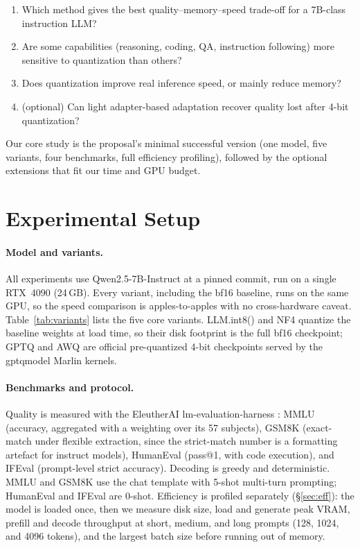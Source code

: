 \documentclass[11pt,a4paper]{article}
\begin{document}
\begin{enumerate}\itemsep1pt
\item[\textbf{RQ1}] Which method gives the best quality--memory--speed trade-off
  for a 7B-class instruction LLM?
\item[\textbf{RQ2}] Are some capabilities (reasoning, coding, QA, instruction
  following) more sensitive to quantization than others?
\item[\textbf{RQ3}] Does quantization improve real inference speed, or mainly
  reduce memory?
\item[\textbf{RQ4}] (optional) Can light adapter-based adaptation recover quality
  lost after 4-bit quantization?
\end{enumerate}

Our core study is the proposal's minimal successful version (one model, five
variants, four benchmarks, full efficiency profiling), followed by the optional
extensions that fit our time and GPU budget.

\section{Experimental Setup}

\paragraph{Model and variants.} All experiments use Qwen2.5-7B-Instruct
\citep{qwen25} at a pinned commit, run on a single RTX~4090
(24\,GB). Every variant, including the bf16 baseline, runs on the same GPU,
so the speed comparison is apples-to-apples with no cross-hardware caveat.
Table~\ref{tab:variants} lists the five core variants. LLM.int8() and NF4 quantize
the baseline weights at load time, so their disk footprint is the full bf16
checkpoint; GPTQ and AWQ are official pre-quantized 4-bit checkpoints served by the
gptqmodel Marlin kernels.

\paragraph{Benchmarks and protocol.} Quality is measured with the EleutherAI
lm-evaluation-harness \citep{lmeval}: MMLU \citep{mmlu} (accuracy, aggregated with
a weighting over its 57 subjects), GSM8K \citep{gsm8k} (exact-match under flexible
extraction, since the strict-match number is a formatting artefact for instruct
models), HumanEval \citep{humaneval} (pass@1, with code execution), and IFEval
\citep{ifeval} (prompt-level strict accuracy). Decoding is greedy and
deterministic.
MMLU and GSM8K use the chat template with 5-shot multi-turn prompting; HumanEval
and IFEval are 0-shot. Efficiency is profiled separately (\S\ref{sec:eff}): the
model is loaded once, then we measure disk size, load and generate peak VRAM,
prefill and decode throughput at short, medium, and long prompts (128, 1024, and
4096 tokens), and the largest batch size before running out of memory.
\end{document}
